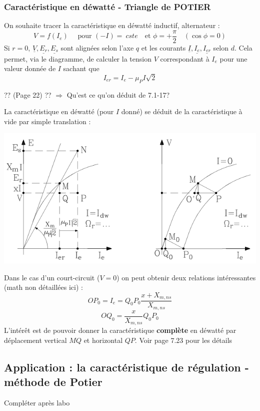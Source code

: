 		\subsubsection{Caractéristique en déwatté - Triangle de POTIER}
		On souhaite tracer la caractéristique en déwatté inductif, alternateur : 
		\begin{equation}
		V = f(I_e)\quad \text{ pour } (-I) =\ cste\quad \text{et } \phi = +\frac{\pi}{
		2}\quad (\cos\phi=0)
		\end{equation}
		Si $r=0$, $\underline{V}, \underline{E_r}, \underline{E_s}$ sont alignées selon 
		l'axe $q$ et les courants $\underline{I},\underline{I_e}, \underline{I_{er}}$ 
		selon $d$. Cela permet, via le diagramme, de calculer la tension $V$ 
		correspondant à $I_e$ pour une valeur donnée de $I$ sachant que
		\begin{equation}
		I_{er} = I_e-\mu_PI\sqrt{2}
		\end{equation}
		
		\begin{center}
		?? (Page 22) ?? $\Rightarrow$ Qu'est ce qu'on déduit de 7.1-17?
		\end{center}
		
		La caractéristique en déwatté (pour $I$ donné) se déduit de la caractéristique 
		à vide par simple translation :
		\begin{center}
		\includegraphics[scale=0.5]{ch7/image8.png}
		\end{center}
		Dans le cas d'un court-circuit ($V=0$) on peut obtenir deux relations 
		intéressantes (math non détaillées ici) :
		\begin{equation}
		OP_0 = I_e = Q_0P_0\dfrac{x+X_{m,ns}}{X_{m,ns}}
		\end{equation}
		\begin{equation}
		OQ_0 = \dfrac{x}{X_{m,ns}}Q_0P_0
		\end{equation}
		L'intérêt est de pouvoir donner la caractéristique \textbf{complète} en 
		déwatté par déplacement vertical $MQ$ et horizontal $QP$. Voir page 7.23 
		pour les détails
		
		
	\subsection{Application : la caractéristique de régulation - méthode de Potier}
	Compléter après labo
		
		
		
		
		
		
		
		
		
		